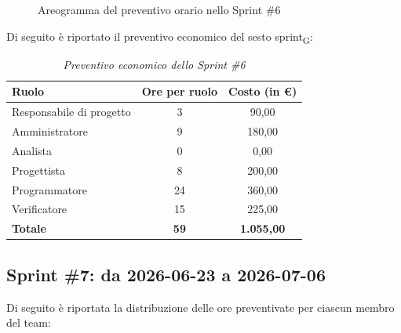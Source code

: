 ﻿\documentclass[a4paper, 10pt, colorlinks=true, linkcolor=black, urlcolor=blue, citecolor=blue, hidelinks]{article}
\renewcommand{\arraystretch}{1.2}
\begin{document}
\begin{figure}[H]

\caption{Areogramma del preventivo orario nello Sprint \#6}
\label{fig:preventivo-sprint6}
\end{figure}

Di seguito è riportato il preventivo economico del sesto sprint\textsubscript{G}:

\begin{table}[H]
    \centering
    \renewcommand{\arraystretch}{1.4}
    \begin{tabular}{|l|c|c|}
        \hline
        \rowcolor{bluBitless!15}
        \textbf{Ruolo} & \textbf{Ore per ruolo} & \textbf{Costo (in €)} \\
        \hline
        Responsabile di progetto & 3 & 90,00 \\ \hline
        Amministratore & 9 & 180,00 \\ \hline
        Analista & 0 & 0,00 \\ \hline
        Progettista & 8 & 200,00 \\ \hline
        Programmatore & 24 & 360,00 \\ \hline
        Verificatore & 15 & 225,00 \\ \hline
        \rowcolor{bluBitless!8}
        \textbf{Totale} & \textbf{59} & \textbf{1.055,00} \\ \hline
    \end{tabular}
    \caption{\textit{Preventivo economico dello Sprint \#6}}
\end{table}

\subsection{Sprint \#7: da 2026-06-23 a 2026-07-06}
Di seguito è riportata la distribuzione delle ore preventivate per ciascun membro del team:
\end{document}
